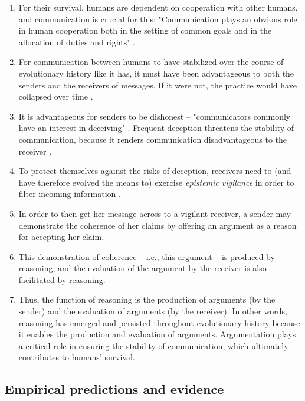 \begin{enumerate}[label=(\arabic*)]
    \item For their survival, humans are dependent on cooperation with other humans, and communication is crucial for this: "Communication plays an obvious role in human cooperation both in the setting of common goals and in the allocation of duties and rights" \citep[p.~60]{MS11}.
    \item For communication between humans to have stabilized over the course of evolutionary history like it has, it must have been advantageous to both the senders and the receivers of messages. If it were not, the practice would have collapsed over time \citep{Sperber01}.
    \item It is advantageous for senders to be dishonest -- "communicators commonly have an interest in deceiving" \citep[p.~160]{MS09}. Frequent deception threatens the stability of communication, because it renders communication disadvantageous to the receiver \citep{Sperber01}.
    \item To protect themselves against the risks of deception, receivers need to (and have therefore evolved the means to) exercise \emph{epistemic vigilance} in order to filter incoming information \citep{Sperber10}.
    \item In order to then get her message across to a vigilant receiver, a sender may demonstrate the coherence of her claims by offering an argument as a reason for accepting her claim.
    \item This demonstration of coherence -- i.e., this argument -- is produced by reasoning, and the evaluation of the argument by the receiver is also facilitated by reasoning.
    \item Thus, the function of reasoning is the production of arguments (by the sender) and the evaluation of arguments (by the receiver). In other words, reasoning has emerged and persisted throughout evolutionary history because it enables the production and evaluation of arguments. Argumentation plays a critical role in ensuring the stability of communication, which ultimately contributes to humans' survival.
\end{enumerate}

\subsection{Empirical predictions and evidence}
\label{sec:empirical}

